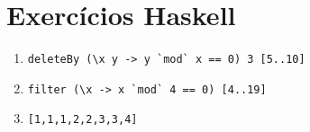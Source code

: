 \documentclass[letterpaper,twocolumn,10pt]{article}
\begin{document}
\section{Exercícios Haskell}

\begin{enumerate}

	\item
		\begin{Verbatim}[tabsize=0, fontsize=\small]
		deleteBy (\x y -> y `mod` x == 0) 3 [5..10]
		\end{Verbatim}

	\item
		\begin{Verbatim}[tabsize=0, fontsize=\small]
		filter (\x -> x `mod` 4 == 0) [4..19]
		\end{Verbatim}

	\item
		\begin{Verbatim}[tabsize=0, fontsize=\small]
		[1,1,1,2,2,3,3,4]
		\end{Verbatim}

\end{enumerate}

\footnotesize 

\end{document}
